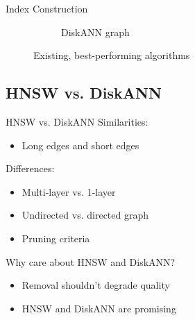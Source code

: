 \begin{frame}{Index Construction}
\begin{figure}[ht]
\begin{subfigure}{0.49\textwidth}
            \caption{DiskANN graph}
        \end{subfigure}
        \hfill
        \caption{Existing, best-performing algorithms}
    \end{figure}
\end{frame}

\subsection{HNSW vs. DiskANN}

\begin{frame}{HNSW vs. DiskANN}
    Similarities:
    \begin{itemize}
        \item Long edges and short edges
    \end{itemize}

    Differences:
    \begin{itemize}
        \item Multi-layer vs. 1-layer
        \item Undirected vs. directed graph
        \item Pruning criteria
    \end{itemize}
\end{frame}

\begin{frame}{Why care about HNSW and DiskANN?}
    \begin{itemize}
        \item Removal shouldn't degrade quality
        \item HNSW and DiskANN are promising 
    \end{itemize}
\end{frame}



